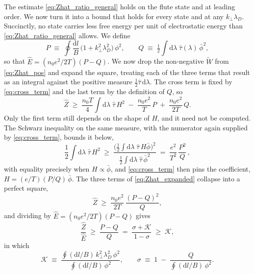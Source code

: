\documentclass{jpp}
\newcommand{\rmd}{\text{d}}
\newcommand{\kperp}{k_\perp}
\newcommand{\lambdaD}{\lambda_D}
\newcommand{\Zhat}{\hat{Z}}
\begin{document}
The estimate \cref{eq:Zhat_ratio_general} holds on the flute state and at leading order. We now turn it into a bound that holds for every state and at any $\kperp\lambdaD$. Succinctly, no state carries less free energy per unit of electrostatic energy than \cref{eq:Zhat_ratio_general} allows. We define
\begin{equation}\label{eq:PQ_def}
P \;\equiv\; \oint \frac{\rmd l}{B}\,\bigl(1+\kperp^2\lambdaD^2\bigr)\,\phi^2 ,
\qquad
Q \;\equiv\; \tfrac{1}{2}\int \rmd\lambda\; \hat\tau(\lambda)\,\bar\phi^2 ,
\end{equation}
so that $\hat E = (n_0e^2/2T)(P-Q)$. We now drop the non-negative $\tilde W$ from \cref{eq:Zhat_pos} and expand the square, treating each of the three terms that result as an integral against the positive measure $\tfrac{1}{2}\hat\tau\,\rmd\lambda$. The cross term is fixed by \cref{eq:cross_term} and the last term by the definition of $Q$, so
\begin{equation}\label{eq:Zhat_expanded}
\Zhat \;\geq\; \frac{n_0 T}{4}\int\rmd\lambda\;\hat\tau\,H^2 \;-\; \frac{n_0 e^2}{T}\,P \;+\; \frac{n_0 e^2}{2T}\,Q .
\end{equation}
Only the first term still depends on the shape of $H$, and it need not be computed. The Schwarz inequality on the same measure, with the numerator again supplied by \cref{eq:cross_term}, bounds it below,
\begin{equation}\label{eq:Zhat_schwarz}
\frac{1}{2}\int\rmd\lambda\;\hat\tau\,H^2
\;\geq\;
\frac{\biggl(\displaystyle\tfrac12\int\rmd\lambda\;\hat\tau\,H\bar\phi\biggr)^{\!2}}{\displaystyle\tfrac12\int\rmd\lambda\;\hat\tau\,\bar\phi^2}
\;=\; \frac{e^2}{T^2}\,\frac{P^2}{Q}\,,
\end{equation}
with equality precisely when $H \propto \bar\phi$, and \cref{eq:cross_term} then pins the coefficient, $H = (e/T)(P/Q)\,\bar\phi$. The three terms of \cref{eq:Zhat_expanded} collapse into a perfect square,
\begin{equation}\label{eq:Zhat_perfect_square}
\Zhat \;\geq\; \frac{n_0e^2}{2T}\,\frac{(P-Q)^2}{Q} ,
\end{equation}
and dividing by $\hat E = (n_0e^2/2T)(P-Q)$ gives
\begin{equation}\label{eq:Zhat_bound}
\frac{\Zhat}{\hat E} \;\geq\; \frac{P-Q}{Q} \;=\; \frac{\sigma + \mathcal{K}}{1-\sigma} \;\geq\; \mathcal{K} ,
\end{equation}
in which
\begin{equation}
\mathcal{K} \;\equiv\; \frac{\displaystyle\oint (\rmd l/B)\,\kperp^2\lambdaD^2\,\phi^2}{\displaystyle\oint (\rmd l/B)\,\phi^2} ,
\qquad
\sigma \;\equiv\; 1 \;-\; \frac{Q}{\displaystyle\oint (\rmd l/B)\,\phi^2} .
\end{equation}
\end{document}
